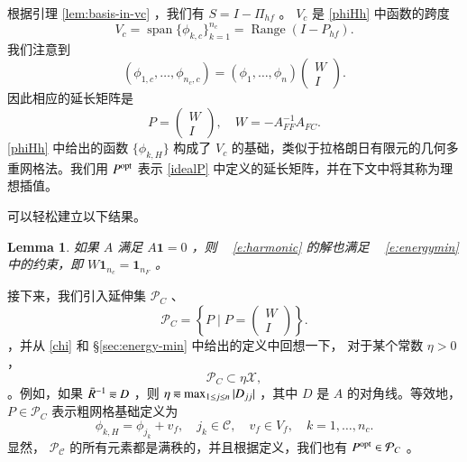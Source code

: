 \documentclass[12pt]{acta_2011xz}
\newcommand{\Span}{\ensuremath{\operatorname{span}}}
\newcommand{\eqqsim}{\mathbin{\rotatebox[origin=c]{180}{\ensuremath{\cong}}}}
\newtheorem{lemma}[theorem]{Lemma}
\begin{document}
根据引理    \ref{lem:basis-in-vc}    ，我们有    $S=I-\Pi_{hf}$    。   $V_c$    是    \eqref{phiHh}    中函数的跨度 
   \begin{equation*} 
   V_c = \Span \{ \phi_{k,c} \} _{k=1}^{n_c}= \operatorname{Range}(I-P_{hf}).
 \end{equation*}    我们注意到
   $$
(\phi_{1,c},  \ldots, \phi_{n_c,c})=(\phi_1,\ldots, \phi_{n})
\begin{pmatrix}
  W \\ 
I
\end{pmatrix}.
$$    因此相应的延长矩阵是
   \begin{equation}\label{idealP}
P=\begin{pmatrix}W \\  I\end{pmatrix}, \quad W=-A_{FF}^{-1}A_{FC}.
\end{equation}       \eqref{phiHh}    中给出的函数    $ \{ \phi_{k, H} \} $    构成了
   $V_c$    的基础，类似于拉格朗日有限元的几何多重网格法。我们用    $P^{\rm opt}$    表示    \eqref{idealP}    中定义的延长矩阵，并在下文中将其称为理想插值。  

可以轻松建立以下结果。
   \begin{lemma}如果    $A$    满足    $A \boldsymbol 1=0$    ，则 ~    \eqref{e:harmonic}    的解也满足 ~    \eqref{e:energymin}    中的约束，即
   \(W\boldsymbol 1_{n_c}=\boldsymbol 1_{n_F}\)    。  \end{lemma}     

接下来，我们引入延伸集    $\mathcal P_C$    、
   $$
\mathcal P_C=
\left \{ P\;\big|\; P=
\begin{pmatrix}
  W \\ 
I
\end{pmatrix}
\right \} .
$$    ，并从    \eqref{chi}    和    \S       \ref{sec:energy-min}    中给出的定义中回想一下，
对于某个常数    $\eta> 0$    ，
   $$
\mathcal P_C\subset \eta\mathcal X,
$$    。例如，如果    $\bar R^{-1} \eqqsim D$    ，则    $\eta\eqqsim \max_{1\le j\le n}|D_{jj}|$    ，其中    $D$    是    $A$    的对角线。等效地，   $P\in \mathcal{P}_C$    表示粗网格基础定义为
   \[ \phi_{k,H} = \phi_{j_k} + v_f, \quad j_k\in \mathcal C, \quad v_f\in V_f,
\quad k=1,\ldots,n_c.
 \]    显然，   $\mathcal{P_C}$    的所有元素都是满秩的，并且根据定义，我们也有
   $P^{\rm opt}\in \mathcal{P}_C$    。  
\end{document}
